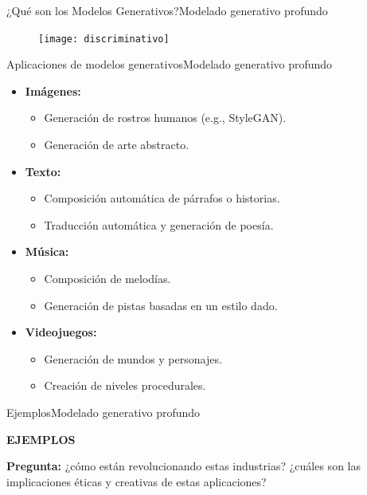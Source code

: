 \documentclass[10pt,border=3pt,tikz]{beamer}
\begin{document}
    \begin{frame}{¿Qué son los Modelos Generativos?}{Modelado generativo profundo}
        \begin{figure}
            \centering
            \texttt{[image: discriminativo]}
        \end{figure}
    \end{frame}
    
    \begin{frame}{Aplicaciones de modelos generativos}{Modelado generativo profundo}
        \begin{itemize}
            \item \textbf{Imágenes:}
            \begin{itemize}
                \item Generación de rostros humanos (e.g., StyleGAN).
                \item Generación de arte abstracto.
            \end{itemize}
            \item \textbf{Texto:}
            \begin{itemize}
                \item Composición automática de párrafos o historias.
                \item Traducción automática y generación de poesía.
            \end{itemize}
            \item \textbf{Música:}
            \begin{itemize}
                \item Composición de melodías.
                \item Generación de pistas basadas en un estilo dado.
            \end{itemize}
            \item \textbf{Videojuegos:}
            \begin{itemize}
                \item Generación de mundos y personajes.
                \item Creación de niveles procedurales.
            \end{itemize}
        \end{itemize}
    \end{frame}
    
    \begin{frame}{Ejemplos}{Modelado generativo profundo}
        \begin{center}
            {\Huge \textbf{EJEMPLOS}}
            
            \textbf{Pregunta:} ¿cómo están revolucionando estas industrias? ¿cuáles son las implicaciones éticas y creativas de estas aplicaciones?
        \end{center}
    \end{frame}
    
\end{document}

